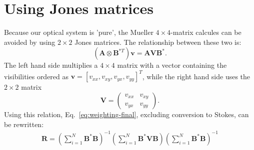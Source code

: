 \documentclass[a4paper,11pt]{article}
\begin{document}
\section{Using Jones matrices}
Because our optical system is 'pure', the Mueller $4\times 4$-matrix calcules can be avoided by using $2\times 2$ Jones matrices. The relationship between these two is:
\begin{equation}
\left(\mathbf{A} \otimes \mathbf{B}^{*T}\right) \mathbf{v} = \textbf{AVB}^*.
\end{equation}
The left hand side multiplies a $4\times 4$ matrix with a vector containing the visibilities ordered as $\mathbf{v}=[v_{xx}, v_{xy}, v_{yx}, v_{yy}]^T$, while the right hand side uses the $2\times 2$ matrix
\begin{equation}
\mathbf{V}=\left(\begin{array}{cc}
v_{xx} & v_{xy}\\ v_{yx} & v_{yy}
\end{array}\right).
\end{equation}
Using this relation, Eq.~\eqref{eq:weighting-final}, excluding conversion to Stokes, can be rewritten:
\begin{eqnarray}
\mathbf{R}=
\left( \sum\limits_{i=1}^N \mathbf{B}^*\mathbf{B}\right)^{-1}
\left( \sum\limits_{i=1}^N \mathbf{B}^*\mathbf{V}\mathbf{B} \right)
\left( \sum\limits_{i=1}^N\mathbf{B}^*\mathbf{B}\right)^{-1}
\end{eqnarray}
\end{document}
